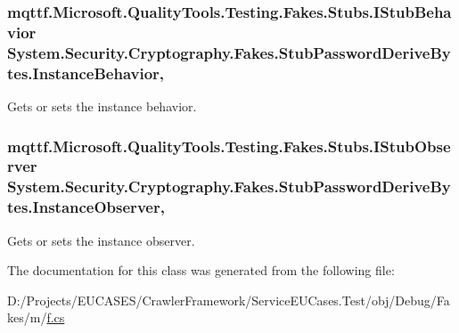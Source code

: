 \hypertarget{class_system_1_1_security_1_1_cryptography_1_1_fakes_1_1_stub_password_derive_bytes_af7393ea9db786edf3ab0d2cd3e4be2e7}{
\subsubsection[{Instance\-Behavior}]{\setlength{\rightskip}{0pt plus 5cm}mqttf.\-Microsoft.\-Quality\-Tools.\-Testing.\-Fakes.\-Stubs.\-I\-Stub\-Behavior System.\-Security.\-Cryptography.\-Fakes.\-Stub\-Password\-Derive\-Bytes.\-Instance\-Behavior\hspace{0.3cm}{\ttfamily [get]}, {\ttfamily [set]}}}\label{class_system_1_1_security_1_1_cryptography_1_1_fakes_1_1_stub_password_derive_bytes_af7393ea9db786edf3ab0d2cd3e4be2e7}


Gets or sets the instance behavior.

\hypertarget{class_system_1_1_security_1_1_cryptography_1_1_fakes_1_1_stub_password_derive_bytes_a9e855930550da80fa4e517e284e424ae}{
\subsubsection[{Instance\-Observer}]{\setlength{\rightskip}{0pt plus 5cm}mqttf.\-Microsoft.\-Quality\-Tools.\-Testing.\-Fakes.\-Stubs.\-I\-Stub\-Observer System.\-Security.\-Cryptography.\-Fakes.\-Stub\-Password\-Derive\-Bytes.\-Instance\-Observer\hspace{0.3cm}{\ttfamily [get]}, {\ttfamily [set]}}}\label{class_system_1_1_security_1_1_cryptography_1_1_fakes_1_1_stub_password_derive_bytes_a9e855930550da80fa4e517e284e424ae}


Gets or sets the instance observer.



The documentation for this class was generated from the following file\-:\begin{DoxyCompactItemize}
\item 
D\-:/\-Projects/\-E\-U\-C\-A\-S\-E\-S/\-Crawler\-Framework/\-Service\-E\-U\-Cases.\-Test/obj/\-Debug/\-Fakes/m/\hyperlink{m_2f_8cs}{f.\-cs}\end{DoxyCompactItemize}
